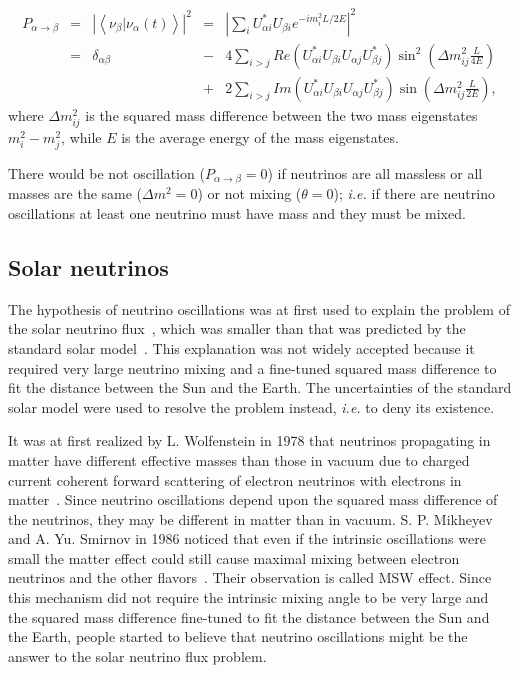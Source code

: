 \begin{equation}
  \label{eq:pa2b}
  \begin{array}{ccccl}
    P_{\alpha \rightarrow \beta} &=& \left| \left\langle                 \nu_{\beta}|\nu_{\alpha}(t) \right\rangle \right|^{2} &=&     {\displaystyle \left|       \sum_{i}U_{\alpha i}^{*}U_{\beta i}e^{-i           m_{i}^2 L/2E} \right|^{2}}\\ &=& \delta_{\alpha\beta} &-&     4{\displaystyle \sum_{i>j}Re(U_{\alpha         i}^{*}U_{\beta         i}U_{\alpha j}U_{\beta j}^{*})\sin^{2}(\Delta     m_{ij}^{2}       \frac{L}{4E})}\\ & & &+& {\displaystyle 2\sum_{i>j}Im(U_{\alpha         i}^{*}U_{\beta i}U_{\alpha j}U_{\beta j}^{*})\sin(\Delta       m_{ij}^{2}\frac{L}{2E})},
  \end{array}
\end{equation}
where $\Delta m^{2}_{ij}$ is the squared mass difference between the
two mass eigenstates $m^{2}_{i} - m^{2}_{j}$, while $E$ is the
average energy of the mass eigenstates.

There would be not oscillation ($P_{\alpha \rightarrow \beta} = 0$) if neutrinos are all massless or all masses are the same ($\Delta m^{2} = 0$) or not mixing ($\theta = 0$); \textit{i.e.} if there are neutrino oscillations at least one neutrino must have mass and they must be mixed.

\subsection{Solar neutrinos}
\label{sec:solar}
The hypothesis of neutrino oscillations was at first used to explain the problem of the solar neutrino flux~\cite{Dav64,Dav68}, which was smaller than that was predicted by the standard solar model~\cite{Bah98}. This explanation was not widely accepted because it required very large neutrino mixing and a fine-tuned squared mass difference to fit the distance between the Sun and the Earth. The uncertainties of the standard solar model were used to resolve the problem instead, \textit{i.e.} to deny its existence.

It was at first realized by L. Wolfenstein in 1978 that neutrinos propagating in matter have different effective masses than those in vacuum due to charged current coherent forward scattering of electron neutrinos with electrons in matter~\cite{Wol78}. Since neutrino oscillations depend upon the squared mass difference of the neutrinos, they may be different in matter than in vacuum. S. P. Mikheyev and A. Yu. Smirnov in 1986 noticed that even if the intrinsic oscillations were small the matter effect could still cause maximal mixing between electron neutrinos and the other flavors~\cite{Mik86}. Their observation is called MSW effect. Since this mechanism did not require the intrinsic mixing angle to be very large and the squared mass difference fine-tuned to fit the distance between the Sun and the Earth, people started to believe that neutrino oscillations might be the answer to the solar neutrino flux problem.

